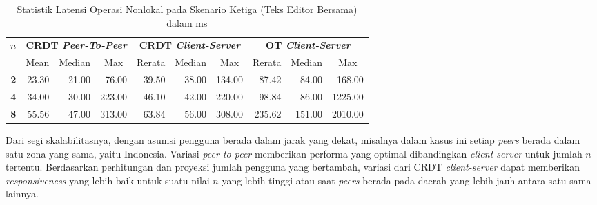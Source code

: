 \begin{table}[H]
 \centering
\begin{tabular}{|c|rrr|rrr|rrr|}
\hline
\multirow{2}{*}{$n$} & \multicolumn{3}{c|}{\textbf{CRDT \textit{Peer-To-Peer}}} & \multicolumn{3}{c|}{\textbf{CRDT \textit{Client-Server}}} & \multicolumn{3}{c|}{\textbf{OT \textit{Client-Server}}} \\ \cline{2-10}
 & \multicolumn{1}{c|}{Mean} & \multicolumn{1}{c|}{Median} & \multicolumn{1}{c|}{Max} & \multicolumn{1}{c|}{Rerata} & \multicolumn{1}{c|}{Median} & \multicolumn{1}{c|}{Max} & \multicolumn{1}{c|}{Rerata} & \multicolumn{1}{c|}{Median} & \multicolumn{1}{c|}{Max} \\ \hline
\textbf{2} & \multicolumn{1}{r|}{23.30} & \multicolumn{1}{r|}{21.00} & 76.00 & \multicolumn{1}{r|}{39.50} & \multicolumn{1}{r|}{38.00} & 134.00 & \multicolumn{1}{r|}{87.42} & \multicolumn{1}{r|}{84.00} & 168.00 \\ \hline
\textbf{4} & \multicolumn{1}{r|}{34.00} & \multicolumn{1}{r|}{30.00} & 223.00 & \multicolumn{1}{r|}{46.10} & \multicolumn{1}{r|}{42.00} & 220.00 & \multicolumn{1}{r|}{98.84} & \multicolumn{1}{r|}{86.00} & 1225.00 \\ \hline
\textbf{8} & \multicolumn{1}{r|}{55.56} & \multicolumn{1}{r|}{47.00} & 313.00 & \multicolumn{1}{r|}{63.84} & \multicolumn{1}{r|}{56.00} & 308.00 & \multicolumn{1}{r|}{235.62} & \multicolumn{1}{r|}{151.00} & 2010.00 \\ \hline
\end{tabular}
 \caption{Statistik Latensi Operasi Nonlokal pada Skenario Ketiga (Teks Editor Bersama) dalam ms}
 \label{tab:latency-3}
\end{table}

Dari segi skalabilitasnya, dengan asumsi pengguna berada dalam jarak yang dekat, misalnya dalam kasus ini setiap \textit{peers} berada dalam satu zona yang sama, yaitu Indonesia. Variasi \textit{peer-to-peer} memberikan performa yang optimal dibandingkan \textit{client-server} untuk jumlah $n$ tertentu. Berdasarkan perhitungan dan proyeksi jumlah pengguna yang bertambah, variasi dari CRDT \textit{client-server} dapat memberikan \textit{responsiveness} yang lebih baik untuk suatu nilai $n$ yang lebih tinggi atau saat \textit{peers} berada pada daerah yang lebih jauh antara satu sama lainnya.

